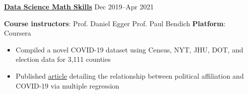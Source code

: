 \textbf{\href{https://www.coursera.org/account/accomplishments/verify/AFQSU5CAT4HD}{Data Science Math Skills}} \hfill Dec 2019--Apr 2021 \par
\textbf{Course instructors}: Prof. Daniel Egger {\scalerel*{\cdot}{\bigodot}} Prof. Paul Bendich {\scalerel*{\cdot}{\bigodot}} \textbf{Platform}: Coursera
\begin{itemize}
	\item Compiled a novel COVID-19 dataset using Census, NYT, JHU, DOT, and election data for 3,111 counties
	\item Published \href{https://econreview.berkeley.edu/partisanship-and-covid-19-response/}{article} detailing the relationship between political affiliation and COVID-19 via multiple regression
\end{itemize}\vspace{0.1cm} \par